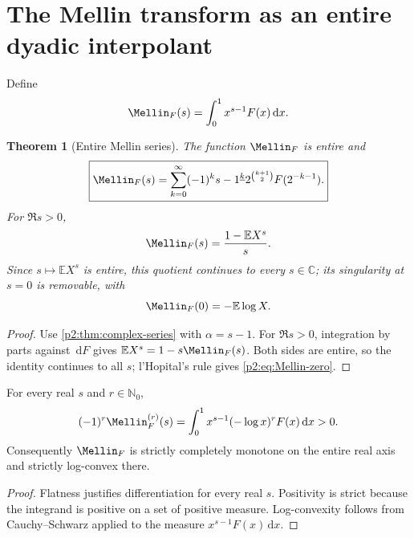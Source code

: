 \documentclass[11pt,oneside]{article}
\newtheorem{theorem}{Theorem}[section]
\theoremstyle{definition}
\theoremstyle{remark}
\newcommand{\E}{\mathbb E}
\newcommand{\C}{\mathbb C}
\newcommand{\N}{\mathbb N}
\newcommand{\dd}{\,\mathrm d}
\newcommand{\fall}[2]{#1^{\underline{#2}}}
\newcommand{\1}{\mathbf 1}
\begin{document}
\section{The Mellin transform as an entire dyadic interpolant}
\label{p2:sec:mellin}

Define
\begin{equation}
 \Mellin_F(s)=\int_0^1x^{s-1}F(x)\dd x.                   \label{p2:eq:Mellin-def}
\end{equation}

\begin{theorem}[Entire Mellin series]
\label{p2:thm:mellin-entire}
The function $\Mellin_F$ is entire and
\begin{equation}
 \boxed{
 \Mellin_F(s)=\sum_{k=0}^{\infty}(-1)^k\fall{s-1}{k}
 2^{\binom{k+1}{2}}F(2^{-k-1}).}                          \label{p2:eq:Mellin-series}
\end{equation}
For $\Re s>0$,
\begin{equation}
 \Mellin_F(s)=\frac{1-\E X^s}{s}.                        \label{p2:eq:Mellin-prob}
\end{equation}
Since $s\mapsto\E X^s$ is entire, this quotient continues to every
$s\in\C$; its singularity at $s=0$ is removable, with
\begin{equation}
 \Mellin_F(0)=-\E\log X.                                 \label{p2:eq:Mellin-zero}
\end{equation}
\end{theorem}

\begin{proof}
Use \cref{p2:thm:complex-series} with $\alpha=s-1$.  For $\Re s>0$, integration
by parts against $\dd F$ gives
$\E X^s=1-s\Mellin_F(s)$.  Both sides are entire, so the identity
continues to all $s$; l'Hopital's rule gives \eqref{p2:eq:Mellin-zero}.
\end{proof}

\begin{proposition}
\label{p2:prop:mellin-cm}
For every real $s$ and $r\in\N_0$,
\begin{equation}
 (-1)^r\Mellin_F^{(r)}(s)
 =\int_0^1x^{s-1}(-\log x)^rF(x)\dd x>0.                  \label{p2:eq:Mellin-cm}
\end{equation}
Consequently $\Mellin_F$ is strictly completely monotone on the entire real
axis and strictly log-convex there.
\end{proposition}

\begin{proof}
Flatness justifies differentiation for every real $s$.  Positivity is strict
because the integrand is positive on a set of positive measure.  Log-convexity
follows from Cauchy--Schwarz applied to the measure
$x^{s-1}F(x)\dd x$.
\end{proof}
\end{document}
